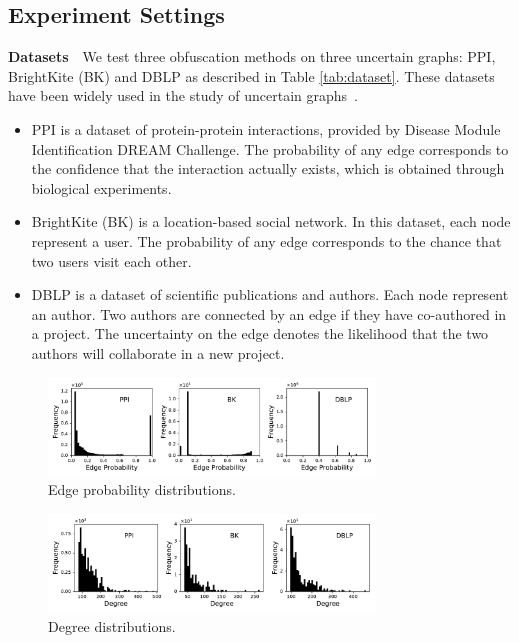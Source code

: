 \subsection{Experiment Settings}




\textbf{Datasets}~~We test three obfuscation methods on three uncertain graphs: PPI, BrightKite (BK) and DBLP as described in Table \ref{tab:dataset}. These datasets have been widely used in the study of uncertain graphs~\cite{Zhao_Detecting_2014,Potamias_K_2010,Jin_Distance_2011}. 

\begin{itemize}
	\item{PPI is a dataset of protein-protein interactions, provided by Disease Module Identification DREAM Challenge. The probability of any edge corresponds to the confidence that the interaction actually exists, which is obtained through biological experiments.}
	\item{BrightKite (BK) is a location-based social network. In this dataset, each node represent a user. The probability of any edge corresponds to the chance that two users visit each other.}
	\item{DBLP is a dataset of scientific publications and authors. Each node represent an author. Two authors are connected by an edge if they have co-authored in a project. The uncertainty on the edge denotes the likelihood that the two authors will collaborate in a new project.}
\end{itemize}
\begin{figure}[!t]
	\begin{flushleft}
	\includegraphics[height=2.6cm]{expResult/probDistribution.pdf}
	\end{flushleft}
	\vspace{-10pt}
	\caption{Edge probability distributions.}
	\vspace{-10pt}
\end{figure}
\begin{figure}[!t]
	\begin{flushleft}
	\includegraphics[height=2.6cm]{expResult/degDistribution.pdf}
	\end{flushleft}
	\vspace{-10pt}
	\caption{Degree distributions.}
	\label{fig:degreeDist}
	\vspace{-10pt}
\end{figure}

